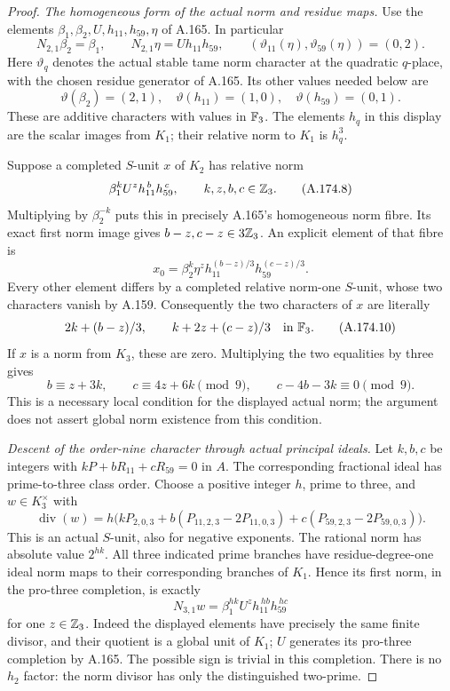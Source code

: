 \begin{proof}
\emph{The homogeneous form of the actual norm and residue maps.}
Use the elements \(\beta_1,\beta_2,U,h_{11},h_{59},\eta\) of A.165.
In particular
\[
 N_{2,1}\beta_2=\beta_1,\qquad
 N_{2,1}\eta=Uh_{11}h_{59},\qquad
 (\vartheta_{11}(\eta),\vartheta_{59}(\eta))=(0,2).
\]
Here \(\vartheta_q\) denotes the actual stable tame norm character
at the quadratic \(q\)-place, with the chosen residue generator
of A.165.  Its other values needed below are
\[
 \vartheta(\beta_2)=(2,1),\quad
 \vartheta(h_{11})=(1,0),\quad
 \vartheta(h_{59})=(0,1).
\tag{A.174.7}
\]
These are additive characters with values in \(\mathbb F_3\).
The elements \(h_q\) in this display are the scalar images from
\(K_1\); their relative norm to \(K_1\) is \(h_q^3\).

Suppose a completed \(S\)-unit \(x\) of \(K_2\) has relative norm
\[
           \beta_1^k U^z h_{11}^{\,b}h_{59}^{\,c},
                       \qquad k,z,b,c\in\mathbb Z_3.
\tag{A.174.8}
\]
Multiplying by \(\beta_2^{-k}\) puts this in precisely A.165's
homogeneous norm fibre.  Its exact first norm image gives
\(b-z,c-z\in3\mathbb Z_3\).  An explicit element of that fibre is
\[
 x_0=\beta_2^k\eta^z
        h_{11}^{(b-z)/3}h_{59}^{(c-z)/3}.
\tag{A.174.9}
\]
Every other element differs by a completed relative norm-one
\(S\)-unit, whose two characters vanish by A.159.
Consequently the two characters of \(x\) are literally
\[
      2k+(b-z)/3,\qquad k+2z+(c-z)/3\quad\text{in }\mathbb F_3.
\tag{A.174.10}
\]
If \(x\) is a norm from \(K_3\), these are zero.
Multiplying the two equalities by three gives
\[
       b\equiv z+3k,\qquad c\equiv4z+6k\pmod9,
       \qquad c-4b-3k\equiv0\pmod9.
\tag{A.174.11}
\]
This is a necessary local condition for the displayed actual norm;
the argument does not assert global norm existence from this condition.

\emph{Descent of the order-nine character through actual principal ideals.}
Let \(k,b,c\) be integers with
\(kP+bR_{11}+cR_{59}=0\) in \(A\).
The corresponding fractional ideal has prime-to-three class order.
Choose a positive integer \(h\), prime to three, and
\(w\in K_3^\times\) with
\[
 \operatorname{div}(w)
 =h\bigl(kP_{2,0,3}
       +b(P_{11,2,3}-2P_{11,0,3})
       +c(P_{59,2,3}-2P_{59,0,3})\bigr).
\tag{A.174.12}
\]
This is an actual \(S\)-unit, also for negative exponents.
The rational norm has absolute value \(2^{hk}\).
All three indicated prime branches have residue-degree-one
ideal norm maps to their corresponding branches of \(K_1\).
Hence its first norm, in the pro-three completion, is exactly
\[
 N_{3,1}w=\beta_1^{hk}U^z h_{11}^{\,hb}h_{59}^{\,hc}
\tag{A.174.13}
\]
for one \(z\in\mathbb Z_3\).
Indeed the displayed elements have precisely the same finite
divisor, and their quotient is a global unit of \(K_1\);
\(U\) generates its pro-three completion by A.165.
The possible sign is trivial in this completion.
There is no \(h_2\) factor: the norm divisor has only the
distinguished two-prime.


\end{proof}
